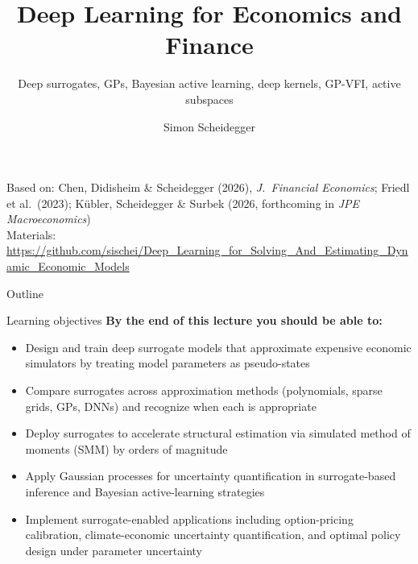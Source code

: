 \documentclass[aspectratio=169,11pt]{beamer}
\title[Deep Learning for Dynamic Economic Models]
{Deep Learning for Economics and Finance}
\subtitle{Deep surrogates, GPs, Bayesian active learning, deep kernels, GP-VFI, active subspaces}
\author{Simon Scheidegger}
\institute[HEC Lausanne]{HEC, University of Lausanne}
\date{}
\begin{document}
\newcommand{\exercisepause}{%
  \tikz[baseline=(X.base)]{\node[fill=darkgreen!80!black, text=white,
  rounded corners=2pt, inner sep=3pt, font=\scriptsize\bfseries](X){PAUSE --- 5 min};}}


{
\begin{frame}
\titlepage
\vspace{-0.4cm}
\begin{center}
{\footnotesize Based on: Chen, Didisheim \& Scheidegger (2026), \emph{J.\ Financial Economics}; Friedl et al.\ (2023); K\"ubler, Scheidegger \& Surbek (2026, forthcoming in \emph{JPE Macroeconomics})}\\[4pt]
{\footnotesize Materials: \url{https://github.com/sischei/Deep_Learning_for_Solving_And_Estimating_Dynamic_Economic_Models}}
\end{center}
\end{frame}
}

\begin{frame}{Outline}
\tableofcontents
\end{frame}

\begin{frame}{Learning objectives}
\textbf{By the end of this lecture you should be able to:}
\begin{itemize}
  \item Design and train deep surrogate models that approximate expensive economic simulators by treating model parameters as pseudo-states
  \item Compare surrogates across approximation methods (polynomials, sparse grids, GPs, DNNs) and recognize when each is appropriate
  \item Deploy surrogates to accelerate structural estimation via simulated method of moments (SMM) by orders of magnitude
  \item Apply Gaussian processes for uncertainty quantification in surrogate-based inference and Bayesian active-learning strategies
  \item Implement surrogate-enabled applications including option-pricing calibration, climate-economic uncertainty quantification, and optimal policy design under parameter uncertainty
\end{itemize}
\end{frame}
\end{document}

